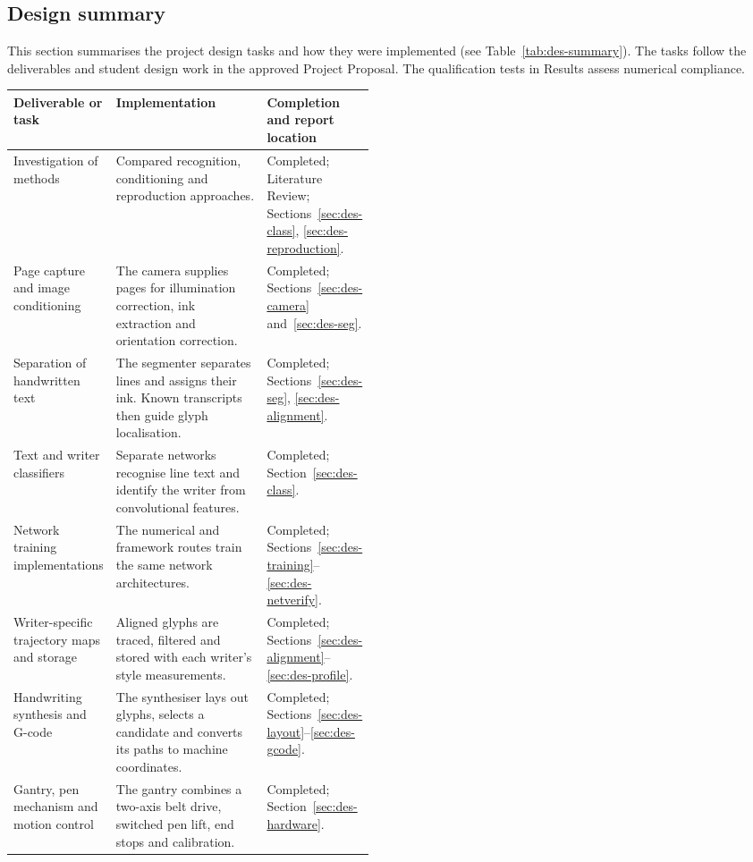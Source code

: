 \subsection{Design summary}
\label{sec:des-summary}
This section summarises the project design tasks and how they were implemented (see Table~\ref{tab:des-summary}). The tasks follow the deliverables and student design work in the approved Project Proposal. The qualification tests in Results assess numerical compliance.

\begin{table}[!htbp]
\centering\small
\begin{tabularx}{\linewidth}{|>{\raggedright\arraybackslash}p{0.24\linewidth}|>{\raggedright\arraybackslash}X|>{\raggedright\arraybackslash}p{0.23\linewidth}|}
\hline
\textbf{Deliverable or task}&\textbf{Implementation}&\textbf{Completion and report location}\\\hline
Investigation of methods&Compared recognition, conditioning and reproduction approaches.&Completed; Literature Review; Sections~\ref{sec:des-class}, \ref{sec:des-reproduction}.\\\hline
Page capture and image conditioning&The camera supplies pages for illumination correction, ink extraction and orientation correction.&Completed; Sections~\ref{sec:des-camera} and~\ref{sec:des-seg}.\\\hline
Separation of handwritten text&The segmenter separates lines and assigns their ink. Known transcripts then guide glyph localisation.&Completed; Sections~\ref{sec:des-seg}, \ref{sec:des-alignment}.\\\hline
Text and writer classifiers&Separate networks recognise line text and identify the writer from convolutional features.&Completed; Section~\ref{sec:des-class}.\\\hline
Network training implementations&The numerical and framework routes train the same network architectures.&Completed; Sections~\ref{sec:des-training}--\ref{sec:des-netverify}.\\\hline
Writer-specific trajectory maps and storage&Aligned glyphs are traced, filtered and stored with each writer's style measurements.&Completed; Sections~\ref{sec:des-alignment}--\ref{sec:des-profile}.\\\hline
Handwriting synthesis and G-code&The synthesiser lays out glyphs, selects a candidate and converts its paths to machine coordinates.&Completed; Sections~\ref{sec:des-layout}--\ref{sec:des-gcode}.\\\hline
Gantry, pen mechanism and motion control&The gantry combines a two-axis belt drive, switched pen lift, end stops and calibration.&Completed; Section~\ref{sec:des-hardware}.\\\hline

\end{tabularx}
\end{table}

